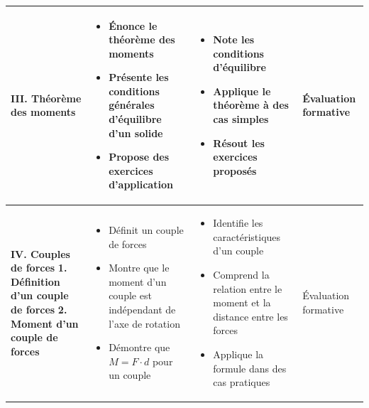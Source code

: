 \documentclass[12pt]{article}
\begin{document}
\begin{tabularx}{\textwidth}{|p{3.5cm}|X|X|p{2.5cm}|}
\textbf{III. Théorème des moments} & 
\begin{itemize}[leftmargin=*]
\item Énonce le théorème des moments
\item Présente les conditions générales d'équilibre d'un solide
\item Propose des exercices d'application
\end{itemize} & 
\begin{itemize}[leftmargin=*]
\item Note les conditions d'équilibre
\item Applique le théorème à des cas simples
\item Résout les exercices proposés
\end{itemize} & 
Évaluation formative \\
\hline

\textbf{IV. Couples de forces}
\textbf{1. Définition d'un couple de forces}
\textbf{2. Moment d'un couple de forces} & 
\begin{itemize}[leftmargin=*]
\item Définit un couple de forces
\item Montre que le moment d'un couple est indépendant de l'axe de rotation
\item Démontre que $M = F \cdot d$ pour un couple
\end{itemize} & 
\begin{itemize}[leftmargin=*]
\item Identifie les caractéristiques d'un couple
\item Comprend la relation entre le moment et la distance entre les forces
\item Applique la formule dans des cas pratiques
\end{itemize} & 
Évaluation formative \\
\hline

\end{tabularx}
\end{document}
